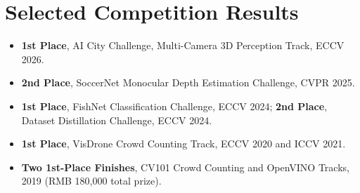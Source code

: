 \documentclass[a4paper,11pt]{article}
\begin{document}
\section{Selected Competition Results}
\begin{itemize}[leftmargin=1.35em,itemsep=0.48em,topsep=0.1em]
  \item \textbf{1st Place}, AI City Challenge, Multi-Camera 3D Perception Track, ECCV 2026.
  \item \textbf{2nd Place}, SoccerNet Monocular Depth Estimation Challenge, CVPR 2025.
  \item \textbf{1st Place}, FishNet Classification Challenge, ECCV 2024; \textbf{2nd Place}, Dataset Distillation Challenge, ECCV 2024.
  \item \textbf{1st Place}, VisDrone Crowd Counting Track, ECCV 2020 and ICCV 2021.
  \item \textbf{Two 1st-Place Finishes}, CV101 Crowd Counting and OpenVINO Tracks, 2019 (RMB 180,000 total prize).
\end{itemize}
\end{document}
